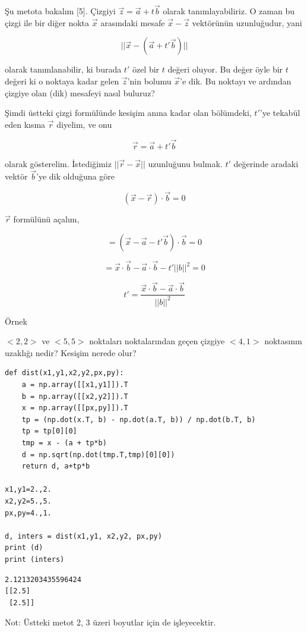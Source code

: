 \documentclass[12pt,fleqn]{article}\usepackage{../../common}
\begin{document}
Şu metota bakalım [5]. Çizgiyi $\vec{z} = \vec{a} + t \vec{b}$ olarak
tanımlayabiliriz. O zaman bu çizgi ile bir diğer nokta $\vec{x}$ arasındaki
mesafe $\vec{x}-\vec{z}$ vektörünün uzunluğudur, yani

$$
|| \vec{x} - (\vec{a} + t' \vec{b}) ||
$$

olarak tanımlanabilir, ki burada $t'$ özel bir $t$ değeri oluyor. Bu değer öyle
bir $t$ değeri ki o noktaya kadar gelen $\vec{z}$'nin bolumu $\vec{x}$'e dik. Bu
noktayı ve ardından çizgiye olan (dik) mesafeyi nasıl buluruz?

Şimdi üstteki çizgi formülünde kesişim anına kadar olan bölümdeki, $t'$'ye
tekabül eden kısma $\vec{r}$ diyelim, ve onu

$$
\vec{r} = \vec{a} + t' \vec{b}
$$

olarak gösterelim. İstediğimiz $||\vec{r}-\vec{x}||$ uzunluğunu bulmak. $t'$
değerinde aradaki vektör $\vec{b}$'ye dik olduğuna göre

$$
(\vec{x} - \vec{r}) \cdot \vec{b} = 0
$$

$\vec{r}$ formülünü açalım,

$$
= (\vec{x} - \vec{a} - t' \vec{b}) \cdot \vec{b} = 0
$$

$$
= \vec{x}\cdot\vec{b} - \vec{a}\cdot\vec{b} - t'||b||^2 = 0
$$

$$
t' = \frac{\vec{x}\cdot\vec{b} - \vec{a}\cdot\vec{b}}{||b||^2}
$$

Örnek

$< 2,2 >$ ve $< 5,5 >$ noktaları noktalarından geçen çizgiye $< 4,1 >$ noktasının
uzaklığı nedir? Kesişim nerede olur?

\begin{verbatim}
def dist(x1,y1,x2,y2,px,py):
    a = np.array([[x1,y1]]).T
    b = np.array([[x2,y2]]).T
    x = np.array([[px,py]]).T
    tp = (np.dot(x.T, b) - np.dot(a.T, b)) / np.dot(b.T, b)
    tp = tp[0][0]
    tmp = x - (a + tp*b)
    d = np.sqrt(np.dot(tmp.T,tmp)[0][0])
    return d, a+tp*b

x1,y1=2.,2.
x2,y2=5.,5.
px,py=4.,1.

d, inters = dist(x1,y1, x2,y2, px,py)
print (d)
print (inters)
\end{verbatim}

\begin{verbatim}
2.1213203435596424
[[2.5]
 [2.5]]
\end{verbatim}

Not: Üstteki metot 2, 3 üzeri boyutlar için de işleyecektir. 
\end{document}
